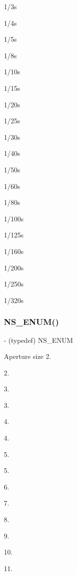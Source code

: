 1/3s

1/4s

1/5s

1/8s

1/10s

1/15s

1/20s

1/25s

1/30s

1/40s

1/50s

1/60s

1/80s

1/100s

1/125s

1/160s

1/200s

1/250s

1/320s\mbox{\label{interface_p_v_camera_settings_def_a0ff3d127f5cc23f518c695cbd6878013}} 
\subsubsection{\texorpdfstring{N\+S\+\_\+\+E\+N\+U\+M()}{NS\_ENUM()}\hspace{0.1cm}{\footnotesize\ttfamily [12/17]}}
{\footnotesize\ttfamily -\/ (typedef) N\+S\+\_\+\+E\+N\+UM \begin{DoxyParamCaption}\item[{(N\+S\+U\+Integer)}]{ }\item[{(P\+V\+Camera\+Aperture)}]{ }\end{DoxyParamCaption}}

Aperture size 2.

2.

3.

3.

4.

4.

5.

5.

6.

7.

8.

9.

10.

11.

